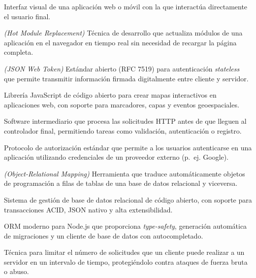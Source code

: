 \documentclass[a4paper]{report}
\begin{document}
\begin{description}[leftmargin=3.5cm, style=nextline]
  \item[\textbf{Frontend}] Interfaz visual de una aplicación web o móvil con la que interactúa directamente el usuario final.

  \item[\textbf{HMR}] \textit{(Hot Module Replacement)} Técnica de desarrollo que actualiza módulos de una aplicación en el navegador en tiempo real sin necesidad de recargar la página completa.

  \item[\textbf{JWT}] \textit{(JSON Web Token)} Estándar abierto (RFC 7519) para autenticación \textit{stateless} que permite transmitir información firmada digitalmente entre cliente y servidor.

  \item[\textbf{Leaflet}] Librería JavaScript de código abierto para crear mapas interactivos en aplicaciones web, con soporte para marcadores, capas y eventos geoespaciales.

  \item[\textbf{Middleware}] Software intermediario que procesa las solicitudes HTTP antes de que lleguen al controlador final, permitiendo tareas como validación, autenticación o registro.

  \item[\textbf{OAuth}] Protocolo de autorización estándar que permite a los usuarios autenticarse en una aplicación utilizando credenciales de un proveedor externo (p.~ej. Google).

  \item[\textbf{ORM}] \textit{(Object-Relational Mapping)} Herramienta que traduce automáticamente objetos de programación a filas de tablas de una base de datos relacional y viceversa.

  \item[\textbf{PostgreSQL}] Sistema de gestión de base de datos relacional de código abierto, con soporte para transacciones ACID, JSON nativo y alta extensibilidad.

  \item[\textbf{Prisma}] ORM moderno para Node.js que proporciona \textit{type-safety}, generación automática de migraciones y un cliente de base de datos con autocompletado.

  \item[\textbf{Rate Limiting}] Técnica para limitar el número de solicitudes que un cliente puede realizar a un servidor en un intervalo de tiempo, protegiéndolo contra ataques de fuerza bruta o abuso.


\end{description}
\end{document}
